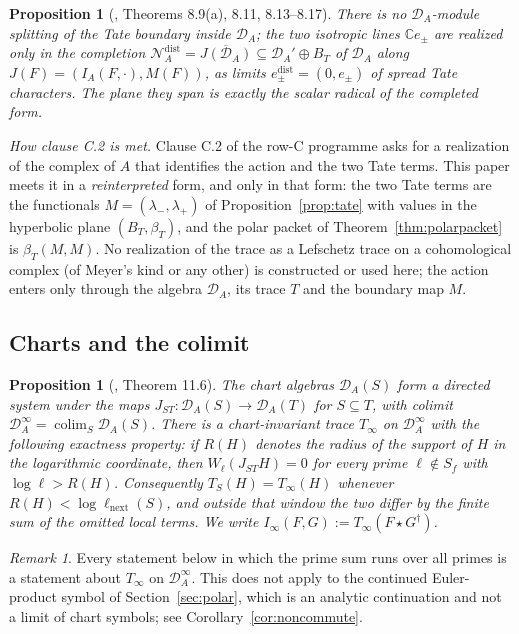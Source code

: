 \documentclass[11pt]{amsart}
\newtheorem{proposition}[theorem]{Proposition}
\theoremstyle{definition}
\theoremstyle{remark}
\newtheorem{remark}[theorem]{Remark}
\newcommand{\C}{\mathbb C}
\newcommand{\DA}{\mathcal D_A}
\newcommand{\BT}{B_T}
\begin{document}
\begin{proposition}[\cite{P43}, Theorems 8.9(a), 8.11, 8.13--8.17]
\label{prop:rulings}
There is no $\DA$-module splitting of the Tate boundary inside $\DA$; the two
isotropic lines $\C e_\pm$ are realized only in the completion
$\mathcal N_A^{\mathrm{dist}}=\overline{J(\DA)}\subseteq\DA'\oplus\BT$ of
$\DA$ along $J(F)=(I_A(F,\cdot),M(F))$, as limits
$e_\pm^{\mathrm{dist}}=(0,e_\pm)$ of spread Tate characters.  The plane they span
is exactly the scalar radical of the completed form.
\end{proposition}

\medskip\noindent{}\label{rem:C2}%
\emph{How clause C.2 is met.}
Clause C.2 of the row-C programme asks for a realization of the complex of
$A$ that identifies the action and the two Tate terms.  This paper meets it in
a \emph{reinterpreted} form, and only in that form: the two Tate terms are the
functionals $M=(\lambda_-,\lambda_+)$ of Proposition~\ref{prop:tate} with
values in the hyperbolic plane $(\BT,\beta_T)$, and the polar packet of
Theorem~\ref{thm:polarpacket} is $\beta_T(M,M)$.  No realization of the
trace as a Lefschetz trace on a cohomological complex (of Meyer's kind or any
other) is constructed or used here; the action enters only through the
algebra $\DA$, its trace $T$ and the boundary map $M$.
\medskip

\subsection{Charts and the colimit}

\begin{proposition}[\cite{P43}, Theorem 11.6]
\label{prop:colimit}
The chart algebras $\DA(S)$ form a directed system under the maps
$J_{ST}\colon\DA(S)\to\DA(T)$ for $S\subseteq T$, with colimit
$\DA^\infty=\operatorname*{colim}_S\DA(S)$.  There is a chart-invariant trace
$T_\infty$ on $\DA^\infty$ with the following exactness property: if
$R(H)$ denotes the radius of the support of $H$ in the logarithmic coordinate,
then $W_\ell(J_{ST}H)=0$ for every prime $\ell\notin S_f$ with
$\log\ell>R(H)$.  Consequently $T_S(H)=T_\infty(H)$ whenever
$R(H)<\log\ell_{\mathrm{next}}(S)$, and outside that window the two differ by
the finite sum of the omitted local terms.  We write
$I_\infty(F,G):=T_\infty(F\star G^\dagger)$.
\end{proposition}

\begin{remark}
\label{rem:C1}
Every statement below in which the prime sum runs over all primes is a
statement about $T_\infty$ on $\DA^\infty$.  This does not apply to the
continued Euler-product symbol of Section~\ref{sec:polar}, which is an
analytic continuation and not a limit of chart symbols; see
Corollary~\ref{cor:noncommute}.
\end{remark}
\end{document}
